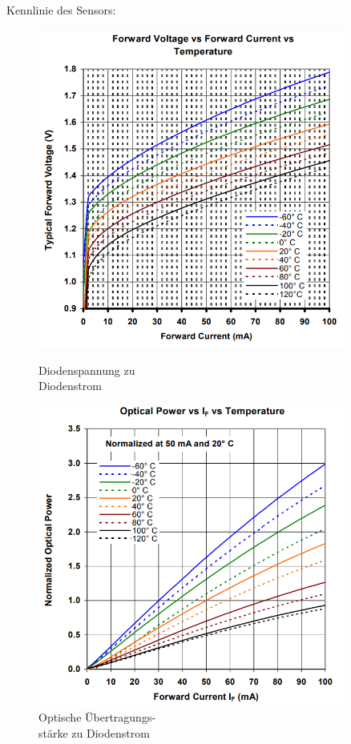 Kennlinie des Sensors:

\begin{figure}[H]
  \begin{minipage}[hbt]{0.45\textwidth}
    \includegraphics[width=0.9\textwidth]{Bilder/Kennlinien/Sens_Vf_If}
 	\caption{Diodenspannung zu \\Diodenstrom}
  	\label{Sens_vf_if}
  \end{minipage}
\hspace{.03\linewidth}
  \begin{minipage}[hbt]{0.45\textwidth}
    \includegraphics[width=0.9\textwidth]{Bilder/Kennlinien/Sens_op_If}
  	\caption{Optische Übertragungs-\\stärke zu Diodenstrom}
  	\label{Sens_op_if}
  \end{minipage}
\end{figure}

